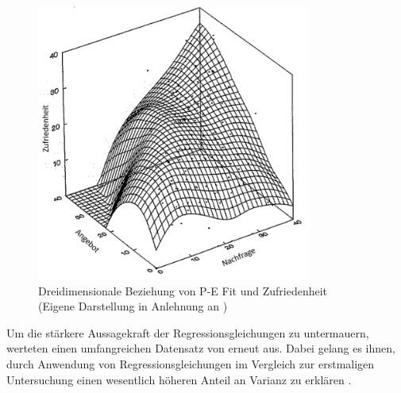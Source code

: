 \begin{figure}[h]
	\centering
	\includegraphics[width=0.8\textwidth]{gfx/drei_d_modell.png}
	\caption[Dreidimensionale Beziehung von P-E Fit und Zufriedenheit]{Dreidimensionale Beziehung von P-E Fit und Zufriedenheit\\
	(Eigene Darstellung in Anlehnung an \cite[S. 57]{edwards:1991})}
	\label{fig:personEnvironmentFit:wichtigkeiten:abb2}
\end{figure}

Um die stärkere Aussagekraft der Regressionsgleichungen zu untermauern, werteten \textcite[S. 18ff.]{edwards:1993b} einen umfangreichen Datensatz von \textcite[S. 9ff.]{mechanismsOfJobStressAndStrain:1982} erneut aus. Dabei gelang es ihnen, durch Anwendung von Regressionsgleichungen im Vergleich zur erstmaligen Untersuchung einen wesentlich höheren Anteil an Varianz zu erklären \cite[S. 8]{su:2015}.
